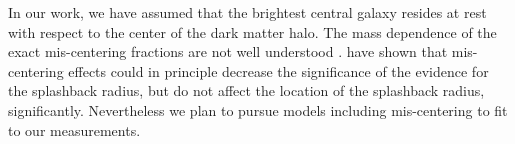 \documentclass[iop, apjl, twocolappendix, numberedappendix]{emulateapj}
\begin{document}

In our work, we have assumed that the brightest central galaxy
resides at rest with respect to the center of the dark matter halo.
The mass dependence of the exact mis-centering fractions are not
well understood \citep{Skibba:2011, Hoshino:2015}.
\citet{baxter2017halo} have shown that mis-centering effects could
in principle decrease the significance of the evidence for the
splashback radius, but do not affect the location of the splashback
radius, significantly. Nevertheless we plan to pursue models
including mis-centering to fit to our measurements.



\end{document}
